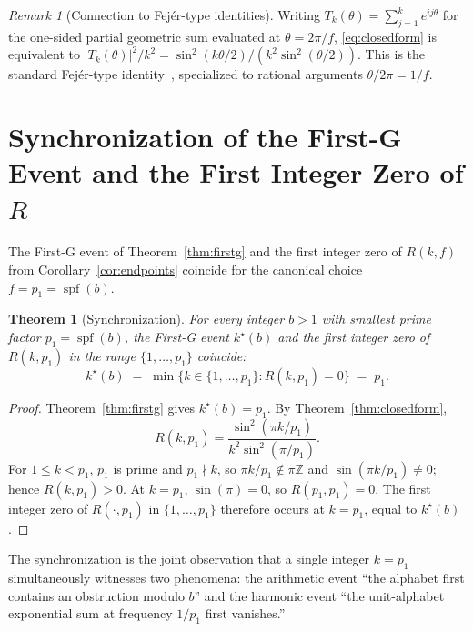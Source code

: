 \documentclass[11pt,reqno]{amsart}
\theoremstyle{plain}
\newtheorem{theorem}{Theorem}
\theoremstyle{definition}
\theoremstyle{remark}
\newtheorem*{remark}{Remark}
\DeclareMathOperator{\spf}{spf}
\newcommand{\Z}{\mathbb{Z}}
\begin{document}
\begin{remark}[Connection to Fej\'{e}r-type identities]\label{rem:fejer}
Writing $T_{k}(\theta) = \sum_{j=1}^{k}e^{ij\theta}$ for the
one-sided partial geometric sum evaluated at $\theta = 2\pi/f$,
\eqref{eq:closedform} is equivalent to
$|T_{k}(\theta)|^{2}/k^{2} = \sin^{2}(k\theta/2)/(k^{2}
\sin^{2}(\theta/2))$. This is the standard Fej\'{e}r-type
identity~\cite{Fejer1900,Zygmund2002}, specialized to rational
arguments $\theta/2\pi = 1/f$.
\end{remark}

\section{Synchronization of the First-G Event and the First Integer Zero of $R$}\label{sec:sync}

The First-G event of Theorem~\ref{thm:firstg} and the first integer
zero of $R(k,f)$ from Corollary~\ref{cor:endpoints} coincide for the
canonical choice $f = p_{1} = \spf(b)$.

\begin{theorem}[Synchronization]\label{thm:sync}
For every integer $b > 1$ with smallest prime factor $p_{1}=\spf(b)$,
the First-G event $k^{\star}(b)$ and the first integer zero of
$R(k,p_{1})$ in the range $\{1,\dots,p_{1}\}$ coincide:
\[
  k^{\star}(b) \;=\; \min\{k \in \{1,\dots,p_{1}\} : R(k,p_{1}) = 0\}
  \;=\; p_{1}.
\]
\end{theorem}

\begin{proof}
Theorem~\ref{thm:firstg} gives $k^{\star}(b) = p_{1}$. By
Theorem~\ref{thm:closedform},
\[
  R(k,p_{1}) = \frac{\sin^{2}(\pi k/p_{1})}{k^{2}\sin^{2}(\pi/p_{1})}.
\]
For $1 \le k < p_{1}$, $p_{1}$ is prime and $p_{1}\nmid k$, so
$\pi k/p_{1}\notin\pi\Z$ and $\sin(\pi k/p_{1})\neq 0$; hence
$R(k,p_{1}) > 0$. At $k = p_{1}$, $\sin(\pi) = 0$, so
$R(p_{1},p_{1}) = 0$. The first integer zero of $R(\cdot,p_{1})$ in
$\{1,\dots,p_{1}\}$ therefore occurs at $k = p_{1}$, equal to
$k^{\star}(b)$.
\end{proof}

The synchronization is the joint observation that a single integer
$k = p_{1}$ simultaneously witnesses two phenomena: the arithmetic
event ``the alphabet first contains an obstruction modulo $b$'' and
the harmonic event ``the unit-alphabet exponential sum at frequency
$1/p_{1}$ first vanishes.''

\end{document}
